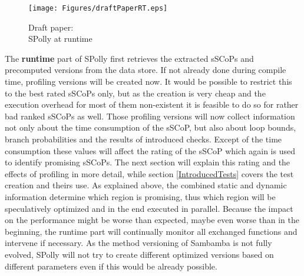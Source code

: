 \begin{figure}
  \centering
  \texttt{[image: Figures/draftPaperRT.eps]}
  \caption{Draft paper: \\ SPolly at runtime}
  \vspace*{-5mm}
  \label{fig:draftPaperCT}  
\end{figure}
The \textbf{runtime} part of SPolly first retrieves the extracted sSCoPs and 
precomputed versions from the data store. If not already done during  compile
time, profiling versions will be created now. It would be possible to restrict
this to the best rated sSCoPs only, but as the creation is very cheap and the execution 
overhead for most of them non-existent it is feasible to do so for rather bad
ranked sSCoPs as well. Those profiling versions will now collect information
not only about the time consumption of the sSCoP, but also about loop bounds,
branch probabilities and the results of introduced checks. Except of the time
consumption these values will affect the rating of the sSCoP which again is used
to identify promising sSCoPs. The next section
will explain this rating and the effects of profiling in more detail, while
section \ref{IntroducedTests} covers the test creation and theirs use. 
As explained above, the combined static and dynamic information determine which region
is promising, thus which region will be speculatively optimized and in the end
executed in parallel. Because the impact on the performance might be worse than
expected, maybe even worse than in the beginning, the runtime part will
continually monitor all exchanged functions and intervene if necessary. As the
method versioning of Sambamba is not fully evolved, SPolly will not try to create
different optimized versions based on different parameters even if this would be
already possible. 


